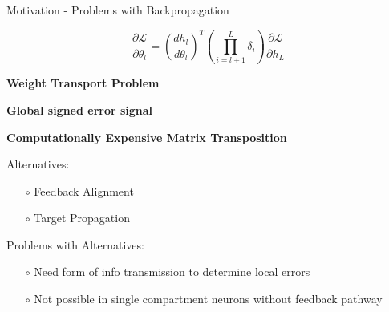 \documentclass[dvipsnames, usenames]{beamer}
\newcommand{\xmark}{\ding{55}}%
\newcommand{\wontfix}{\rlap{$\square$}{\large\hspace{1pt}\xmark}}
\begin{document}
\begin{frame}{Motivation - Problems with Backpropagation}
\vspace{-0.5cm}

\begin{equation*}
	\frac{\partial \mathcal{L}}{\partial \theta_l} 
	=  \left(\frac{dh_{l}}{d \theta_{l}}\right)^T \left(\prod_{i=l+1}^L \delta_i\right) \frac{\partial \mathcal{L}}{\partial h_{L}}
\end{equation*}

\begin{todolist}
\item[\wontfix] \textbf{Weight Transport Problem} \pause
\item[\wontfix] \textbf{Global signed error signal} \pause
\item[\wontfix] \textbf{Computationally Expensive Matrix Transposition} \pause
\item Alternatives:
\begin{itemize}
	\item[$\circ$] Feedback Alignment \citep{lillicrap2016}
	\item[$\circ$] Target Propagation \citep{lee2015}
\end{itemize}
\pause
\item Problems with Alternatives:
\begin{itemize}
	\item[$\circ$] Need form of info transmission to determine local errors 
	\item[$\circ$] Not possible in single compartment neurons without feedback pathway
\end{itemize}
\end{todolist}
\end{frame}
\end{document}
